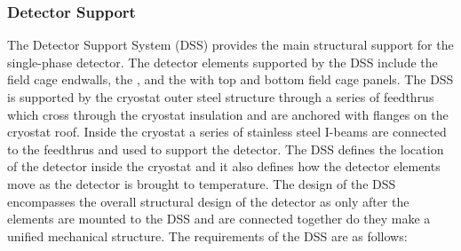 \subsubsection{Detector Support}

The Detector Support System (DSS) provides the main structural support
for the single-phase detector.  The detector elements supported by the
DSS include the field cage endwalls, the , and
the  with top and bottom field cage panels.  The DSS is
supported by the cryostat outer steel structure through a series of
feedthrus which cross through the cryostat insulation and are anchored
with flanges on the cryostat roof. Inside the cryostat a series of
stainless steel I-beams are connected to the feedthrus and used to
support the detector. The DSS defines the location of the detector
inside the cryostat and it also defines how the detector elements move
as the detector is brought to  temperature. The design of the DSS
encompasses the overall structural design of the detector as only
after the elements are mounted to the DSS and are connected together
do they make a unified mechanical structure. The requirements of the
DSS are as follows:
